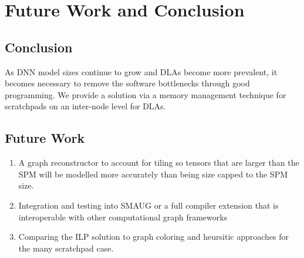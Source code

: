 \chapter{Future Work and Conclusion} %

\label{Chapter8} %

\section{Conclusion}
As DNN model sizes continue to grow and DLAs become more prevalent, it becomes
necessary to remove the software bottlenecks through good programming. We
provide a solution via a memory management technique for scratchpads on an
inter-node level for DLAs.

\section{Future Work}


\begin{enumerate}
	\item A graph reconstructor to account for tiling so tensors that are
		larger than the SPM will be modelled more accurately than being
		size capped to the SPM size.
	\item Integration and testing into SMAUG or a full compiler extension
		that is interoperable with other computational graph frameworks
	\item Comparing the ILP solution to graph coloring and heursitic
		approaches for the many scratchpad case.
\end{enumerate}
